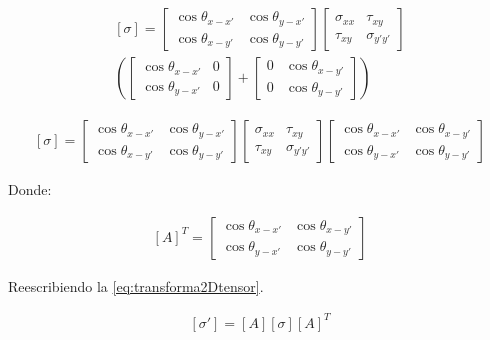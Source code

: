 \documentclass[12pt,letterpaper, twoside, openany]{article}
\begin{document}
\begin{large}
	\begin{align}
	\left[\sigma\right]=
		\left[ \begin{array}{cc}
		\cos \theta_{x-x'} & \cos \theta_{y-x'} \\  
		\cos \theta_{x-y'} & \cos \theta_{y-y'}
		\end{array}  \right]
%		
		\left[ \begin{array}{cc}
		\sigma_{xx} & \tau_{xy} \\  
		\tau_{xy} & \sigma_{y'y'}
		\end{array}  \right]\nonumber\\
%
\left(
		\left[ \begin{array}{cc}
		\cos \theta_{x-x'} & 0\\ 
		\cos \theta_{y-x'} & 0
		\end{array}  \right]+
%		
		\left[ \begin{array}{cc}
		0 & \cos \theta_{x-y'}\\ 
		0 & \cos \theta_{y-y'}
		\end{array}  \right]
\right)
	\end{align}
\end{large}
%
%
\begin{large}
	\begin{align}
	\left[\sigma\right]=
		\left[ \begin{array}{cc}
		\cos \theta_{x-x'} & \cos \theta_{y-x'} \\  
		\cos \theta_{x-y'} & \cos \theta_{y-y'}
		\end{array}  \right]
%		
		\left[ \begin{array}{cc}
		\sigma_{xx} & \tau_{xy} \\  
		\tau_{xy} & \sigma_{y'y'}
		\end{array}  \right]
%		
		\left[ \begin{array}{cc}
		\cos \theta_{x-x'} & \cos \theta_{x-y'}\\ 
		\cos \theta_{y-x'} &\cos \theta_{y-y'}
		\end{array}  \right]
		\label{eq:siPnew}
	\end{align}
\end{large}
%
Donde:
%
\begin{large}
	\begin{align}
	\left[A\right]^T=	
		\left[ \begin{array}{cc}
		\cos \theta_{x-x'} & \cos \theta_{x-y'}\\ 
		\cos \theta_{y-x'} &\cos \theta_{y-y'}
		\end{array}  \right]
		\label{eq:transfortrans}
	\end{align}
\end{large}
%
Reescribiendo la \cref{eq:transforma2Dtensor}.
%
\begin{large}
	\begin{align}
		\left[ \sigma' \right] = \left[ A \right] \left[ \sigma \right] \left[ A \right]^T 
		\label{eq:transforma2Dtensor2}
	\end{align}
\end{large}

%
\end{document}
